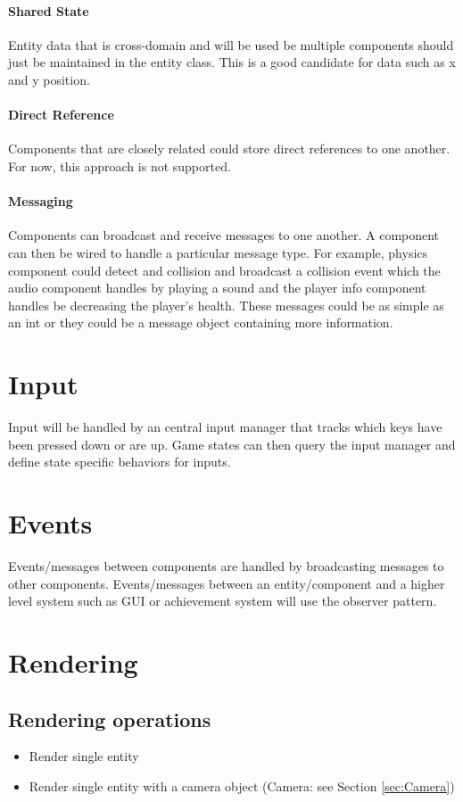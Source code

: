 \documentclass[12pt]{article}
\begin{document}
\paragraph{ Shared State}
Entity data that is cross-domain and will be used be multiple components should just be maintained in the entity class.  This is a good candidate for data such as x and y position.
\paragraph{ Direct Reference }
Components that are closely related could store direct references to one another.  For now, this approach is not supported.
\paragraph{ Messaging }
Components can broadcast and receive messages to one another.  A component can then be wired to handle a particular message type.  For example, physics component could detect and collision and broadcast a collision event which the audio component handles by playing a sound and the player info component handles be decreasing the player's health.  These messages could be as simple as an int or they could be a message object containing more information.

\section{	Input }
Input will be handled by an central input manager that tracks which keys have been pressed down or are up.  Game states can then query the input manager and define state specific behaviors for inputs.

\section{	Events }
Events/messages between components are handled by broadcasting messages to other components.  Events/messages between an entity/component and a higher level system such as GUI or achievement system will use the observer pattern.  

\section{	Rendering }
\subsection{Rendering operations }
\begin{itemize}
	\item Render single entity
	\item Render single entity with a camera object (Camera: see Section \ref{sec:Camera})
\end{itemize}
\end{document}
